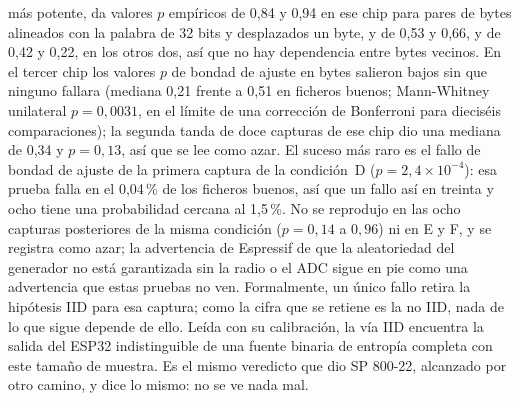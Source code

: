 más potente, da valores $p$ empíricos de 0,84 y 0,94 en ese chip para
pares de bytes alineados con la palabra de 32 bits y desplazados un byte,
y de 0,53 y 0,66, y de 0,42 y 0,22, en los otros dos, así que no hay
dependencia entre bytes vecinos. En el tercer chip los valores $p$ de
bondad de ajuste en bytes salieron bajos sin que ninguno fallara (mediana
0,21 frente a 0,51 en ficheros buenos; Mann-Whitney unilateral
$p = 0{,}0031$, en el límite de una corrección de Bonferroni para
dieciséis comparaciones); la segunda tanda de doce capturas de ese chip
dio una mediana de 0,34 y $p = 0{,}13$, así que se lee como azar. El
suceso más raro es el fallo de bondad de ajuste de la primera captura de
la condición~D ($p = 2{,}4\times10^{-4}$): esa prueba falla en el
0,04\,\% de los ficheros buenos, así que un fallo así en treinta y ocho
tiene una probabilidad cercana al 1,5\,\%. No se reprodujo en las ocho
capturas posteriores de la misma condición ($p = 0{,}14$ a $0{,}96$) ni
en E y F, y se registra como azar;
la advertencia de Espressif de que la aleatoriedad del generador no está
garantizada sin la radio o el ADC sigue en pie como una advertencia que
estas pruebas no ven. Formalmente, un único fallo retira la hipótesis IID
para esa captura; como la cifra que se retiene es la no IID, nada de lo
que sigue depende de ello. Leída con su calibración, la vía IID encuentra
la salida del ESP32 indistinguible de una fuente binaria de entropía
completa con este tamaño de muestra. Es el mismo veredicto que dio
SP 800-22, alcanzado por otro camino, y dice lo mismo: no se ve nada mal.

